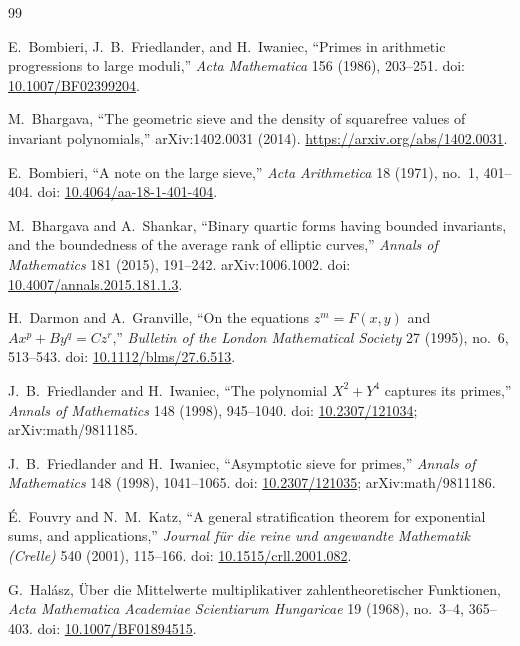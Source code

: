 \documentclass[11pt,a4paper]{article}
\begin{document}
\begingroup
\small
\setlength{\itemsep}{0pt}
\setlength{\parskip}{0pt}
\setlength{\parsep}{0pt}
\begin{thebibliography}{99}

E.~Bombieri, J.~B.~Friedlander, and H.~Iwaniec, ``Primes in arithmetic progressions to large moduli,''
\emph{Acta Mathematica} 156 (1986), 203--251. doi:
\href{https://doi.org/10.1007/BF02399204}{10.1007/BF02399204}.

M.~Bhargava, ``The geometric sieve and the density of squarefree values of invariant polynomials,''
arXiv:1402.0031 (2014). \url{https://arxiv.org/abs/1402.0031}.

E.~Bombieri, ``A note on the large sieve,''
\emph{Acta Arithmetica} 18 (1971), no.\ 1, 401--404. doi:
\href{https://doi.org/10.4064/aa-18-1-401-404}{10.4064/aa-18-1-401-404}.

M.~Bhargava and A.~Shankar, ``Binary quartic forms having bounded invariants, and the boundedness of the average rank of elliptic curves,'' \emph{Annals of Mathematics} 181 (2015), 191--242. arXiv:1006.1002.
doi: \href{https://doi.org/10.4007/annals.2015.181.1.3}{10.4007/annals.2015.181.1.3}.

H.~Darmon and A.~Granville, ``On the equations $z^m=F(x,y)$ and $Ax^p+By^q=Cz^r$,''
\emph{Bulletin of the London Mathematical Society} 27 (1995),
no.\ 6, 513--543. doi:
\href{https://doi.org/10.1112/blms/27.6.513}{10.1112/blms/27.6.513}.

J.~B.~Friedlander and H.~Iwaniec, ``The polynomial $X^2+Y^4$ captures its primes,''
\emph{Annals of Mathematics} 148 (1998), 945--1040.
doi: \href{https://doi.org/10.2307/121034}{10.2307/121034};
arXiv:math/9811185.

J.~B.~Friedlander and H.~Iwaniec, ``Asymptotic sieve for primes,''
\emph{Annals of Mathematics} 148 (1998), 1041--1065.
doi: \href{https://doi.org/10.2307/121035}{10.2307/121035};
arXiv:math/9811186.

É.~Fouvry and N.~M.~Katz, ``A general stratification theorem for exponential sums, and applications,''
\emph{Journal für die reine und angewandte Mathematik (Crelle)} 540 (2001), 115--166. doi:
\href{https://doi.org/10.1515/crll.2001.082}{10.1515/crll.2001.082}.

G.~Halász, \glqq Über die Mittelwerte multiplikativer zahlentheoretischer Funktionen\grqq{},
\emph{Acta Mathematica Academiae Scientiarum Hungaricae} 19 (1968), no.\ 3--4, 365--403. doi:
\href{https://doi.org/10.1007/BF01894515}{10.1007/BF01894515}.


\end{thebibliography}
\end{document}
